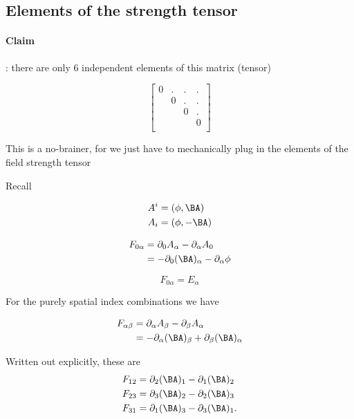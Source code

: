 \subsection{Elements of the strength tensor}

\paragraph{Claim}: there are only 6 independent elements of this matrix (tensor)

\begin{equation}\label{eqn:relativisticElectrodynamicsL11:50}
\begin{bmatrix}
0 & . & . & . \\ 
  & 0 & . & . \\ 
  &   & 0 & . \\ 
  &   &   & 0 \\ 
\end{bmatrix}
\end{equation}

This is a no-brainer, for we just have to mechanically plug in the elements of the field strength tensor

Recall

\begin{align}\label{eqn:relativisticElectrodynamicsL11:70}
A^i &= (\phi, \BA) \\
A_i &= (\phi, -\BA)
\end{align}

\begin{align*}
F_{0\alpha} 
&= 
\partial_0 A_\alpha - \partial_\alpha A_0  \\
&= 
-\partial_0 (\BA)_\alpha - \partial_\alpha \phi  \\
\end{align*}

\begin{equation}\label{eqn:relativisticElectrodynamicsL11:71}
F_{0\alpha} = E_\alpha
\end{equation}

For the purely spatial index combinations we have

\begin{align*}
F_{\alpha\beta} 
&= \partial_\alpha A_\beta - \partial_\beta A_\alpha  \\
&= -\partial_\alpha (\BA)_\beta + \partial_\beta (\BA)_\alpha  \\
\end{align*}

Written out explicitly, these are
\begin{align}\label{eqn:relativisticElectrodynamicsL11:90}
F_{1 2} &= \partial_2 (\BA)_1 -\partial_1 (\BA)_2  \\
F_{2 3} &= \partial_3 (\BA)_2 -\partial_2 (\BA)_3  \\
F_{3 1} &= \partial_1 (\BA)_3 -\partial_3 (\BA)_1 .
\end{align}

